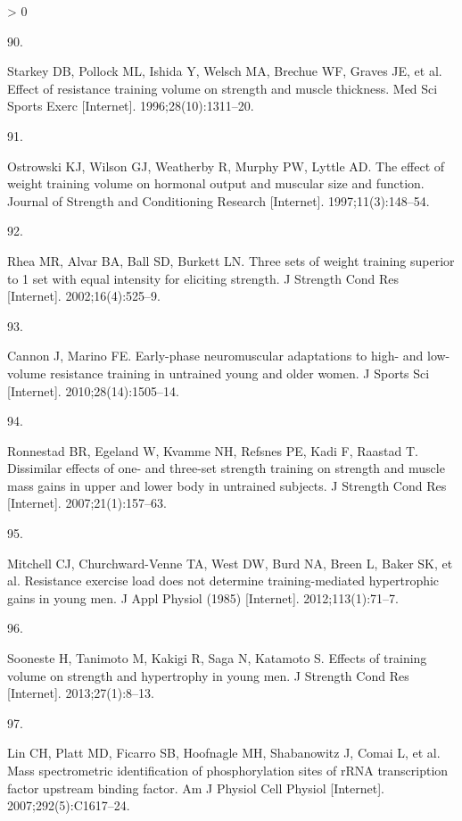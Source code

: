\documentclass[twoside,10pt]{gihclass} %
\newlength{\cslhangindent}
\newlength{\csllabelwidth}
\newenvironment{CSLReferences}[3] %
 {%
  \setlength{\parindent}{0pt}
  \ifodd #1 \everypar{\setlength{\hangindent}{\cslhangindent}}\ignorespaces\fi
  \ifnum #2 > 0
  \setlength{\parskip}{#2\baselineskip}
  \fi
 }%
 {}
\newcommand{\CSLLeftMargin}[1]{\parbox[t]{\maxof{\widthof{#1}}{\csllabelwidth}}{#1}}
\newcommand{\CSLRightInline}[1]{\parbox[t]{\linewidth}{#1}}
\begin{document}
\begin{CSLReferences}{0}{0}
\leavevmode\hypertarget{ref-RN1456}{}%
\CSLLeftMargin{90. }
\CSLRightInline{Starkey DB, Pollock ML, Ishida Y, Welsch MA, Brechue WF, Graves JE, et al. Effect of resistance training volume on strength and muscle thickness. Med Sci Sports Exerc {[}Internet{]}. 1996;28(10):1311--20. }

\leavevmode\hypertarget{ref-RN1454}{}%
\CSLLeftMargin{91. }
\CSLRightInline{Ostrowski KJ, Wilson GJ, Weatherby R, Murphy PW, Lyttle AD. The effect of weight training volume on hormonal output and muscular size and function. Journal of Strength and Conditioning Research {[}Internet{]}. 1997;11(3):148--54. }

\leavevmode\hypertarget{ref-RN1384}{}%
\CSLLeftMargin{92. }
\CSLRightInline{Rhea MR, Alvar BA, Ball SD, Burkett LN. Three sets of weight training superior to 1 set with equal intensity for eliciting strength. J Strength Cond Res {[}Internet{]}. 2002;16(4):525--9. }

\leavevmode\hypertarget{ref-RN1382}{}%
\CSLLeftMargin{93. }
\CSLRightInline{Cannon J, Marino FE. Early-phase neuromuscular adaptations to high- and low-volume resistance training in untrained young and older women. J Sports Sci {[}Internet{]}. 2010;28(14):1505--14. }

\leavevmode\hypertarget{ref-RN776}{}%
\CSLLeftMargin{94. }
\CSLRightInline{Ronnestad BR, Egeland W, Kvamme NH, Refsnes PE, Kadi F, Raastad T. Dissimilar effects of one- and three-set strength training on strength and muscle mass gains in upper and lower body in untrained subjects. J Strength Cond Res {[}Internet{]}. 2007;21(1):157--63. }

\leavevmode\hypertarget{ref-RN834}{}%
\CSLLeftMargin{95. }
\CSLRightInline{Mitchell CJ, Churchward-Venne TA, West DW, Burd NA, Breen L, Baker SK, et al. Resistance exercise load does not determine training-mediated hypertrophic gains in young men. J Appl Physiol (1985) {[}Internet{]}. 2012;113(1):71--7. }

\leavevmode\hypertarget{ref-RN1607}{}%
\CSLLeftMargin{96. }
\CSLRightInline{Sooneste H, Tanimoto M, Kakigi R, Saga N, Katamoto S. Effects of training volume on strength and hypertrophy in young men. J Strength Cond Res {[}Internet{]}. 2013;27(1):8--13. }

\leavevmode\hypertarget{ref-RN2563}{}%
\CSLLeftMargin{97. }
\CSLRightInline{Lin CH, Platt MD, Ficarro SB, Hoofnagle MH, Shabanowitz J, Comai L, et al. Mass spectrometric identification of phosphorylation sites of rRNA transcription factor upstream binding factor. Am J Physiol Cell Physiol {[}Internet{]}. 2007;292(5):C1617--24. }


\end{CSLReferences}
\end{document}
